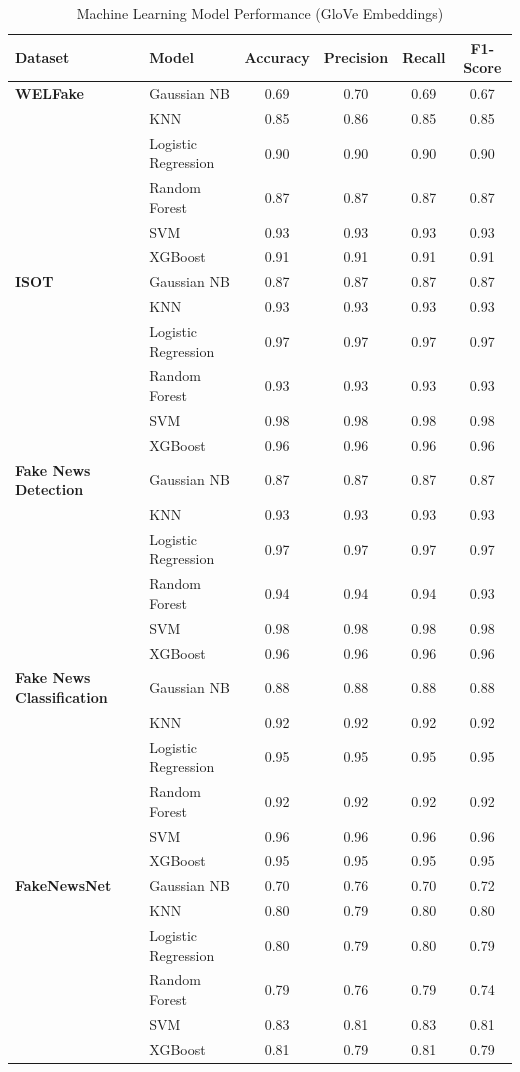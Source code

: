 \documentclass[stu,12pt,floatsintext,donotrepeattitle]{apa7}
\begin{document}
\begin{table}[H]
\centering
\small
\caption{Machine Learning Model Performance (GloVe Embeddings)}
\label{tab:glove_ml}
\begin{tabular}{llcccc}
\toprule
\textbf{Dataset} & \textbf{Model} & \textbf{Accuracy} & \textbf{Precision} & \textbf{Recall} & \textbf{F1-Score} \\
\midrule
\textbf{WELFake} & Gaussian NB & 0.69 & 0.70 & 0.69 & 0.67 \\
 & KNN & 0.85 & 0.86 & 0.85 & 0.85 \\
 & Logistic Regression & 0.90 & 0.90 & 0.90 & 0.90 \\
 & Random Forest & 0.87 & 0.87 & 0.87 & 0.87 \\
 & SVM & 0.93 & 0.93 & 0.93 & 0.93 \\
 & XGBoost & 0.91 & 0.91 & 0.91 & 0.91 \\
\midrule
\textbf{ISOT} & Gaussian NB & 0.87 & 0.87 & 0.87 & 0.87 \\
 & KNN & 0.93 & 0.93 & 0.93 & 0.93 \\
 & Logistic Regression & 0.97 & 0.97 & 0.97 & 0.97 \\
 & Random Forest & 0.93 & 0.93 & 0.93 & 0.93 \\
 & SVM & 0.98 & 0.98 & 0.98 & 0.98 \\
 & XGBoost & 0.96 & 0.96 & 0.96 & 0.96 \\
\midrule
\textbf{Fake News Detection} & Gaussian NB & 0.87 & 0.87 & 0.87 & 0.87 \\
 & KNN & 0.93 & 0.93 & 0.93 & 0.93 \\
 & Logistic Regression & 0.97 & 0.97 & 0.97 & 0.97 \\
 & Random Forest & 0.94 & 0.94 & 0.94 & 0.93 \\
 & SVM & 0.98 & 0.98 & 0.98 & 0.98 \\
 & XGBoost & 0.96 & 0.96 & 0.96 & 0.96 \\
\midrule
\textbf{Fake News Classification} & Gaussian NB & 0.88 & 0.88 & 0.88 & 0.88 \\
 & KNN & 0.92 & 0.92 & 0.92 & 0.92 \\
 & Logistic Regression & 0.95 & 0.95 & 0.95 & 0.95 \\
 & Random Forest & 0.92 & 0.92 & 0.92 & 0.92 \\
 & SVM & 0.96 & 0.96 & 0.96 & 0.96 \\
 & XGBoost & 0.95 & 0.95 & 0.95 & 0.95 \\
\midrule
\textbf{FakeNewsNet} & Gaussian NB & 0.70 & 0.76 & 0.70 & 0.72 \\
 & KNN & 0.80 & 0.79 & 0.80 & 0.80 \\
 & Logistic Regression & 0.80 & 0.79 & 0.80 & 0.79 \\
 & Random Forest & 0.79 & 0.76 & 0.79 & 0.74 \\
 & SVM & 0.83 & 0.81 & 0.83 & 0.81 \\
 & XGBoost & 0.81 & 0.79 & 0.81 & 0.79 \\
\bottomrule
\end{tabular}
\end{table}
\end{document}
